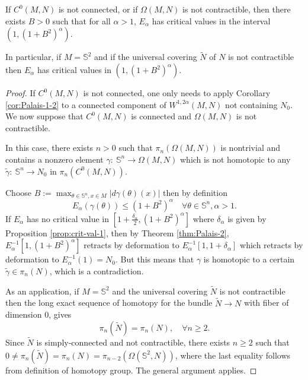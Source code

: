 \begin{theorem}
\label{thm:3-nontrivial-crit}
If \(C^0(M,N)\) is not connected, or if \(\Omega(M,N)\) is not contractible, then
there exists \(B>0\) such that for all \(\alpha >1\), \(E_\alpha\) has critical
values in the interval \((1, (1+B^2)^\alpha)\). 

In particular, if \(M=\mathbb{S}^2\) and if the universal covering \(\tilde N\) of \(N\) is not contractible then \(E_\alpha\) has critical values in \((1, (1+B^2)^\alpha)\).
\end{theorem}

\begin{proof}
If \(C^0(M,N)\) is not connected, one only needs to apply Corollary \ref{cor:Palais-1-2} to a
connected component of \(W^{1,2\alpha}(M,N)\) not containing \(N_0\). We now suppose
that \(C^0(M,N)\) is connected and \(\Omega(M,N)\) is not contractible.


In this case, there exists \(n>0\) such that \(\pi_n(\Omega(M,N))\) is nontrivial and
contains a nonzero element \(\gamma:\ \mathbb{S}^n \longrightarrow  \Omega(M,N)\)
which is not homotopic to any \(\tilde\gamma:\ \mathbb{S}^n \longrightarrow N_0\) in \(\pi_n(C^0(M,N))\).


Choose \(B:= \max_{\theta\in \mathbb{S}^n,x\in M} |d\gamma(\theta)(x)|\) then by
definition
\[
 E_\alpha(\gamma(\theta)) \leq (1+B^2)^\alpha\quad\forall \theta\in \mathbb{S}^n,\alpha>1.
\]
If \(E_\alpha\) has no critical value in \([1+\frac{\delta_\alpha}{2}, (1+B^2)^\alpha]\) where \(\delta_\alpha\) is given by Proposition \ref{prop:crit-val-1}, then by Theorem
\ref{thm:Palais-2}, \(E_\alpha^{-1}[1, (1+B^2)^\alpha]\) retracts by deformation to \(E_\alpha^{-1}[1, 1+\delta_\alpha]\) which retracts by deformation to \(E_\alpha^{-1}(1)=N_0\). But this means that \(\gamma\) is homotopic to a certain \(\tilde\gamma\in \pi_n(N)\), which is a contradiction.


As an application, if \(M= \mathbb{S}^2\) and the universal covering \(\tilde N\) is
not contractible then the long exact sequence of homotopy for the bundle \(\tilde N
\longrightarrow N\) with fiber of dimension \(0\), gives
\[
 \pi_n(\tilde N) = \pi_n(N),\quad \forall n\geq 2.
\]
Since \(\tilde N\) is simply-connected and not contractible, there exists \(n\geq 2\)
such that \(0\ne\pi_n(\tilde N) = \pi_n(N) = \pi_{n-2}(\Omega(\mathbb{S}^2,N))\), where
the last equality follows from definition of homotopy group. The
general argument applies.
\end{proof}


